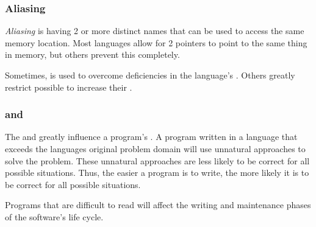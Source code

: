 \subsubsection{Aliasing}\label{subsubsec:Aliasing}
\begin{definition}[Aliasing]\label{def:Aliasing}
  \emph{Aliasing} is having 2 or more distinct names that can be used to access the same memory location.
  Most languages allow for 2 pointers to point to the same thing in memory, but others prevent this completely.
\end{definition}

Sometimes,  is used to overcome deficiencies in the language's .
Others greatly restrict possible  to increase their .

\subsubsection{ and }\label{subsubsec:Reliable_Readability_and_Writability}
The  and  greatly influence a program's .
A program written in a language that exceeds the languages original problem domain will use unnatural approaches to solve the problem.
These unnatural approaches are less likely to be correct for all possible situations.
Thus, the easier a program is to write, the more likely it is to be correct for all possible situations.

Programs that are difficult to read will affect the writing and maintenance phases of the software's life cycle.

